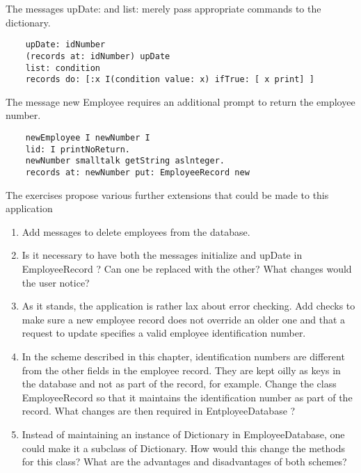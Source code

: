 The messages upDate: and list: merely pass appropriate commands to
the dictionary.
\begin{lstlisting}
    upDate: idNumber
    (records at: idNumber) upDate
    list: condition
    records do: [:x I(condition value: x) ifTrue: [ x print] ]
\end{lstlisting}

The message new Employee requires an additional prompt to return
the employee number.

\begin{lstlisting}
    newEmployee I newNumber I
    lid: I printNoReturn.
    newNumber smalltalk getString aslnteger.
    records at: newNumber put: EmployeeRecord new
\end{lstlisting}

The exercises propose various further extensions that could be made
to this application




\begin{enumerate}

    \item Add messages to delete employees from the database.

    \item Is it necessary to have both the messages initialize and upDate in EmployeeRecord ? Can one be replaced with the other? What changes
    would the user notice?

    \item As it stands, the application is rather lax about error checking. Add
    checks to make sure a new employee record does not override an older
    one and that a request to update specifies a valid employee identification number.

    \item In the scheme described in this chapter, identification numbers are
    different from the other fields in the employee record. They are kept
    oilly as keys in the database and not as part of the record, for example.
    Change the class EmployeeRecord so that it maintains the identification number as part of the record. What changes are then required
    in EntployeeDatabase ?

    \item Instead of maintaining an instance of Dictionary in EmployeeDatabase, one could make it a subclass of Dictionary. How would
    this change the methods for this class? What are the advantages and
    disadvantages of both schemes?

\end{enumerate}

\secup
